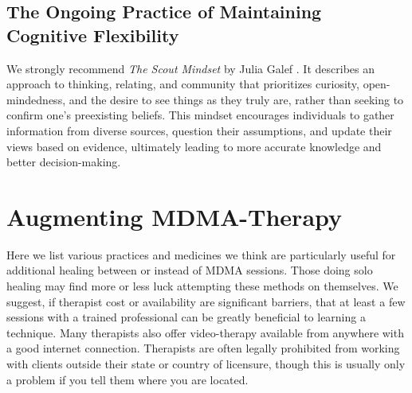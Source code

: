 \documentclass[12pt,letterpaper]{article}
\begin{document}
\subsection{The Ongoing Practice of Maintaining Cognitive Flexibility}
We strongly recommend \textit{The Scout Mindset} by Julia Galef \cite{galefScoutMindset}. It describes an approach to thinking, relating, and community that prioritizes curiosity, open-mindedness, and the desire to see things as they truly are, rather than seeking to confirm one's preexisting beliefs. This mindset encourages individuals to gather information from diverse sources, question their assumptions, and update their views based on evidence, ultimately leading to more accurate knowledge and better decision-making.
\section{Augmenting MDMA-Therapy}
\label{healingPractices}
Here we list various practices and medicines we think are particularly useful for additional healing between or instead of MDMA sessions. Those doing solo healing may find more or less luck attempting these methods on themselves. We suggest, if therapist cost or availability are significant barriers, that at least a few sessions with a trained professional can be greatly beneficial to learning a technique. Many therapists also offer video-therapy available from anywhere with a good internet connection. Therapists are often legally prohibited from working with clients outside their state or country of licensure, though this is usually only a problem if you tell them where you are located.
\end{document}
